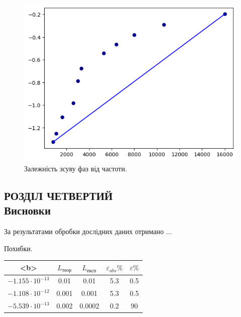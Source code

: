 \documentclass[a4paper,12pt]{article}
\begin{document}
\newpage
    \begin{figure}[h!]
		\centering
		\begin{minipage}[h]{1\linewidth}
			\includegraphics[width=0.8\linewidth]{Prt sc/Figure_3.png}
			\caption{Залежність зсуву фаз від частоти.}
			\label{Figure_3}
		\end{minipage}
	\end{figure}

\newpage
	\begin{center}
		\section* {РОЗДІЛ ЧЕТВЕРТИЙ\\Висновки}
	\end{center}
    За результатами обробки дослідних даних отримано ...

    \begin{center}
		Похибки.
	\end{center}

    \begin{table}[h!]
        \centering
        \begin{tabular}{|c|c|c|c|c|}
            \hline
            \textbf{<b>} & \textbf{$L_{\textrm{теор}}$} & \textbf{$L_{\textrm{експ}}$} & \textbf{$\varepsilon_{abs}\%$} & \textbf{$\varepsilon\%$} \\ \hline
            $-1.155\cdot10^{-13}$               & 0.01                & 0.01                & 5.3                            & 0.5                      \\ \hline
            $-1.108\cdot10^{-12}$               & 0.001               & 0.001               & 5.3                            & 0.5                      \\ \hline
            $-5.539\cdot10^{-13}$               & 0.002               & 0.0002              & 0.2                            & 90                       \\ \hline
        \end{tabular}
    \end{table}
    
\end{document}
